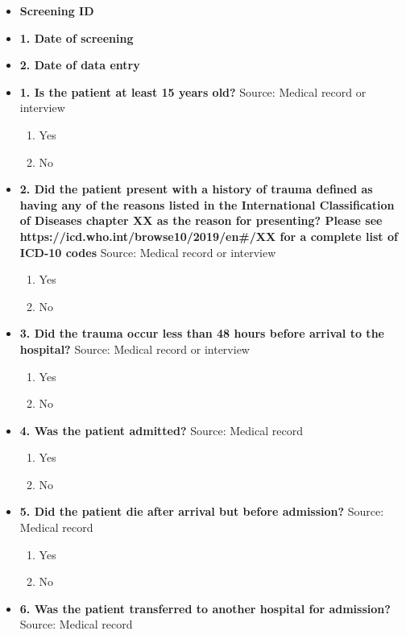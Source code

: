 \documentclass[
]{scrartcl}
\providecommand{\tightlist}{%
  \setlength{\itemsep}{0pt}\setlength{\parskip}{0pt}}\usepackage{longtable,booktabs,array}
\begin{document}
\begin{itemize}
\item
  \textbf{Screening ID}
\item
  \textbf{1. Date of screening}
\item
  \textbf{2. Date of data entry}
\item
  \textbf{1. Is the patient at least 15 years old?} Source: Medical
  record or interview

  \begin{enumerate}
  \def\labelenumi{\arabic{enumi}.}
  \tightlist
  \item
    Yes
  \item
    No
  \end{enumerate}
\item
  \textbf{2. Did the patient present with a history of trauma defined as
  having any of the reasons listed in the International Classification
  of Diseases chapter XX as the reason for presenting? Please see
  https://icd.who.int/browse10/2019/en\#/XX for a complete list of
  ICD-10 codes} Source: Medical record or interview

  \begin{enumerate}
  \def\labelenumi{\arabic{enumi}.}
  \tightlist
  \item
    Yes
  \item
    No
  \end{enumerate}
\item
  \textbf{3. Did the trauma occur less than 48 hours before arrival to
  the hospital?} Source: Medical record or interview

  \begin{enumerate}
  \def\labelenumi{\arabic{enumi}.}
  \tightlist
  \item
    Yes
  \item
    No
  \end{enumerate}
\item
  \textbf{4. Was the patient admitted?} Source: Medical record

  \begin{enumerate}
  \def\labelenumi{\arabic{enumi}.}
  \tightlist
  \item
    Yes
  \item
    No
  \end{enumerate}
\item
  \textbf{5. Did the patient die after arrival but before admission?}
  Source: Medical record

  \begin{enumerate}
  \def\labelenumi{\arabic{enumi}.}
  \tightlist
  \item
    Yes
  \item
    No
  \end{enumerate}
\item
  \textbf{6. Was the patient transferred to another hospital for
  admission?} Source: Medical record


\end{itemize}
\end{document}
